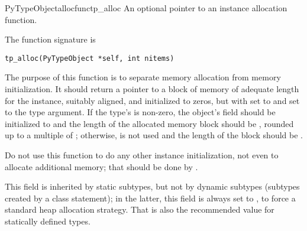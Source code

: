 \begin{cmemberdesc}{PyTypeObject}{allocfunc}{tp_alloc}
  An optional pointer to an instance allocation function.

  The function signature is

\begin{verbatim}
tp_alloc(PyTypeObject *self, int nitems)
\end{verbatim}

  The purpose of this function is to separate memory allocation from
  memory initialization.  It should return a pointer to a block of
  memory of adequate length for the instance, suitably aligned, and
  initialized to zeros, but with  set to 
  and  set to the type argument.  If the type's
   is non-zero, the object's  field
  should be initialized to  and the length of the
  allocated memory block should be , rounded up to a multiple of
  ; otherwise,  is not used and the
  length of the block should be .

  Do not use this function to do any other instance initialization,
  not even to allocate additional memory; that should be done by
  .

  This field is inherited by static subtypes, but not by dynamic
  subtypes (subtypes created by a class statement); in the latter,
  this field is always set to , to
  force a standard heap allocation strategy.  That is also the
  recommended value for statically defined types.
\end{cmemberdesc}

